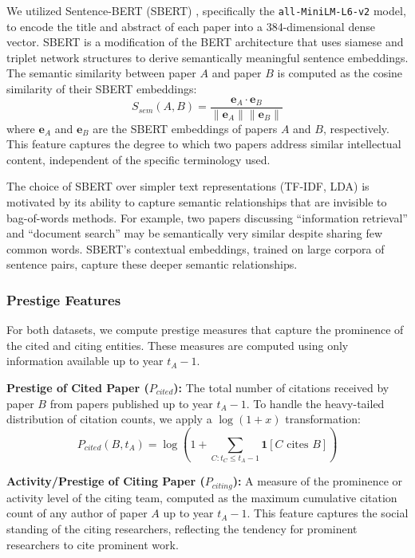 \documentclass[12pt,a4paper]{article}
\begin{document}
We utilized Sentence-BERT (SBERT) \citep{reimers2019sentence}, specifically the \texttt{all-MiniLM-L6-v2} model, to encode the title and abstract of each paper into a 384-dimensional dense vector. SBERT is a modification of the BERT architecture \citep{devlin2019bert} that uses siamese and triplet network structures to derive semantically meaningful sentence embeddings. The semantic similarity between paper $A$ and paper $B$ is computed as the cosine similarity of their SBERT embeddings:
\begin{equation}
S_{sem}(A, B) = \frac{\mathbf{e}_A \cdot \mathbf{e}_B}{\|\mathbf{e}_A\| \|\mathbf{e}_B\|}
\end{equation}
where $\mathbf{e}_A$ and $\mathbf{e}_B$ are the SBERT embeddings of papers $A$ and $B$, respectively. This feature captures the degree to which two papers address similar intellectual content, independent of the specific terminology used.

The choice of SBERT over simpler text representations (TF-IDF, LDA) is motivated by its ability to capture semantic relationships that are invisible to bag-of-words methods. For example, two papers discussing ``information retrieval'' and ``document search'' may be semantically very similar despite sharing few common words. SBERT's contextual embeddings, trained on large corpora of sentence pairs, capture these deeper semantic relationships.

\subsubsection{Prestige Features}

For both datasets, we compute prestige measures that capture the prominence of the cited and citing entities. These measures are computed using only information available up to year $t_A - 1$.

\textbf{Prestige of Cited Paper ($P_{cited}$):} The total number of citations received by paper $B$ from papers published up to year $t_A - 1$. To handle the heavy-tailed distribution of citation counts, we apply a $\log(1 + x)$ transformation:
\begin{equation}
P_{cited}(B, t_A) = \log\left(1 + \sum_{C : t_C \le t_A - 1} \mathbf{1}[C \text{ cites } B]\right)
\end{equation}

\textbf{Activity/Prestige of Citing Paper ($P_{citing}$):} A measure of the prominence or activity level of the citing team, computed as the maximum cumulative citation count of any author of paper $A$ up to year $t_A - 1$. This feature captures the social standing of the citing researchers, reflecting the tendency for prominent researchers to cite prominent work.
\end{document}
